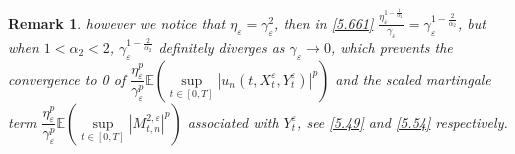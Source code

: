 \documentclass[11pt,reqno]{amsart}
\newtheorem{remark}{\indent Remark}[section]
\numberwithin{equation}{section}
\begin{document}
\begin{remark}
however we notice that  $\eta_{\varepsilon}=\gamma_{\varepsilon}^{2}$, then in \eqref{5.661} $\frac{\eta_{\varepsilon}^{1-\frac{1}{\alpha_{2}}}}{\gamma_{\varepsilon}}=\gamma_{\varepsilon}^{1-\frac{2}{\alpha_{2}}}$, but when $1<\alpha_{2}<2$, $\gamma_{\varepsilon}^{1-\frac{2}{\alpha_{2}}}$ definitely diverges as  $\gamma_{\varepsilon}\rightarrow0$, which   prevents the convergence  to 0 of $ \dfrac{\eta_{\varepsilon}^{p}}{\gamma_{\varepsilon}^{p}}\mathbb{E}\left( \underset{t\in [0,T]}{\sup}|u_{n}(t,X_{t}^{\varepsilon},Y_{t}^{\varepsilon})|^{p}\right)$ and the scaled martingale term  $\dfrac{\eta_{\varepsilon}^{p}}{\gamma_{\varepsilon}^{p}}\mathbb{E}\left(\underset{t\in [0,T]}{\sup} |M_{t,n}^{2,\varepsilon}|^{p}\right)$ associated with  $ Y^{\varepsilon}_{t}$, see \eqref{5.49} and \eqref{5.54} respectively.

\end{remark}
\end{document}

